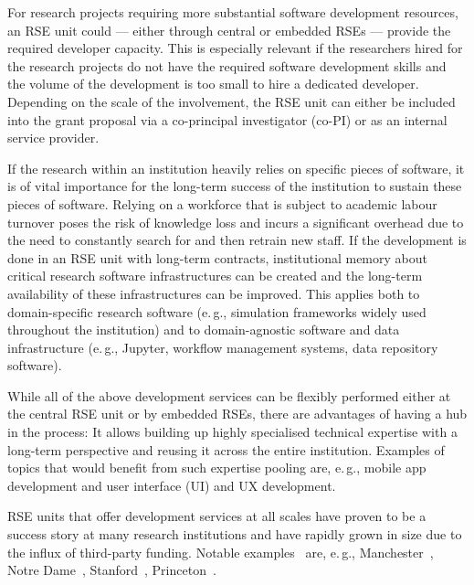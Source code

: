 \documentclass[a4paper]{article}
\newcommand*{\eg}{e.\,g.,\xspace}
\begin{document}
For research projects requiring more substantial software development resources, an RSE unit could --- either through central or embedded RSEs --- provide the required developer capacity.
This is especially relevant if the researchers hired for the research projects do not have the required software development skills and the volume of the development is too small to hire a dedicated developer.
Depending on the scale of the involvement, the RSE unit can either be included into the grant proposal via a co-principal investigator (co-PI) or as an internal service provider.

If the research within an institution heavily relies on specific pieces of software, it is of vital importance for the long-term success of the institution to sustain these pieces of software.
Relying on a workforce that is subject to academic labour turnover poses the risk of knowledge loss and incurs a significant overhead due to the need to constantly search for and then retrain new staff.
If the development is done in an RSE unit with long-term contracts, institutional memory about critical research software infrastructures can be created and the long-term availability of these infrastructures can be improved.
This applies both to domain-specific research software (\eg{} simulation frameworks widely used throughout the institution)
  and to domain-agnostic software and data infrastructure (\eg{} Jupyter, workflow management systems, data repository software).

While all of the above development services can be flexibly performed either at the central RSE unit or by embedded RSEs, there are advantages of having a hub in the process:
It allows building up highly specialised technical expertise with a long-term perspective and reusing it across the entire institution.
Examples of topics that would benefit from such expertise pooling are, \eg{} mobile app development and user interface (UI) and UX development.

RSE units that offer development services at all scales have proven to be a success story at many research institutions and have rapidly grown in size due to the influx of third-party funding.
Notable examples~\autocite{Katz2019} are, \eg{} Manchester~\autocite{Sinclair2022}, Notre Dame~\autocite{NotreDame2025}, Stanford~\autocite{Stanford2025}, Princeton~\autocite{Princeton2025, Cosden2022a}.
\end{document}
